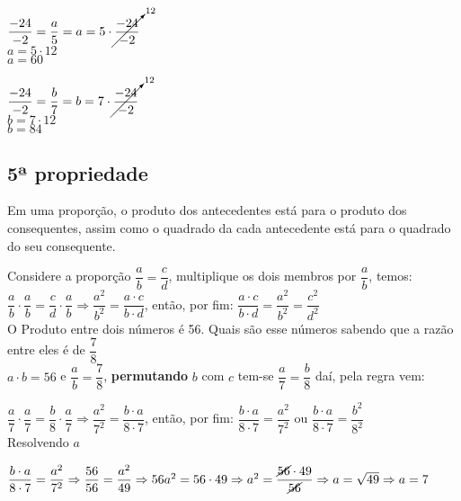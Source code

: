 \begin{enumerate}
\begin{multicols}{2}
$ \dfrac{-24}{-2} = \dfrac{a}{5} = a = 5 \cdot \cancelto{12}{\dfrac{ -24}{-2}}$\\

$ a = 5 \cdot 12$\\

$ a = 60 $
\columnbreak

$ \dfrac{-24}{-2} = \dfrac{b}{7} = b = 7 \cdot \cancelto{12}{\dfrac{ -24}{-2}}$\\

$ b = 7 \cdot 12$\\

$ b = 84 $
\end{multicols}

\subsection{5ª propriedade}

Em uma proporção, o produto dos antecedentes está para o produto dos consequentes, assim como o quadrado da cada antecedente está para o quadrado do seu consequente.

Considere a proporção $ \dfrac{a}{b} = \dfrac{c}{d} $, multiplique os dois membros por $ \dfrac{a}{b} $, temos:\\ $ \dfrac{a}{b} \cdot \dfrac{a}{b} = \dfrac{c}{d} \cdot \dfrac{a}{b} \Rightarrow \dfrac{a^2}{b^2} = \dfrac{a \cdot c}{b \cdot d} $, então, por fim: $ \dfrac{a \cdot c}{b \cdot d} = \dfrac{a^2}{b^2} = \dfrac{c^2}{d^2} $\\

O Produto entre dois números é 56. Quais são esse números sabendo que a razão entre eles é de $ \dfrac{7}{8} $\\

$ a \cdot b = 56 $ e $ \dfrac{a}{b} = \dfrac{7}{8} $, \textbf{permutando} $ b $ com $ c $ tem-se $ \dfrac{a}{7} = \dfrac{b}{8} $ daí, pela regra vem:

$ \dfrac{a}{7} \cdot \dfrac{a}{7} = \dfrac{b}{8} \cdot \dfrac{a}{7} \Rightarrow \dfrac{a^2}{7^2} = \dfrac{b \cdot a}{8 \cdot 7} $, então, por fim: $ \dfrac{b \cdot a}{8 \cdot 7} = \dfrac{a^2}{7^2} $ ou $\dfrac{b \cdot a}{8 \cdot 7} = \dfrac{b^2}{8^2} $\\

Resolvendo $ a $

$ \dfrac{b \cdot a}{8 \cdot 7} = \dfrac{a^2}{7^2} \Rightarrow \dfrac{56}{56} = \dfrac{a^2}{49} \Rightarrow 56a^2 = 56 \cdot 49 \Rightarrow a^2 = \dfrac{\cancel{56} \cdot 49}{\cancel{56}} \Rightarrow a = \sqrt{49} \Rightarrow a = 7 $\\


\end{enumerate}
